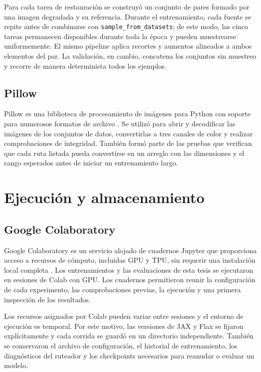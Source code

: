 \documentclass[
  11pt,
  oneside,
  english,
  spanish,
  singlespacing,
  headsepline
]{MastersDoctoralThesis}
\begin{document}
Para cada tarea de restauración se construyó un conjunto de pares formado por una imagen degradada y su referencia. Durante el entrenamiento, cada fuente se repite antes de combinarse con \texttt{sample\_from\_datasets}; de este modo, las cinco tareas permanecen disponibles durante toda la época y pueden muestrearse uniformemente. El mismo pipeline aplica recortes y aumentos alineados a ambos elementos del par. La validación, en cambio, concatena los conjuntos sin muestreo y recorre de manera determinista todos los ejemplos.

\subsection{Pillow}

Pillow es una biblioteca de procesamiento de imágenes para Python con soporte para numerosos formatos de archivo \citep{pillowDocs}. Se utilizó para abrir y decodificar las imágenes de los conjuntos de datos, convertirlas a tres canales de color y realizar comprobaciones de integridad. También formó parte de las pruebas que verifican que cada ruta listada pueda convertirse en un arreglo con las dimensiones y el rango esperados antes de iniciar un entrenamiento largo.

\section{Ejecución y almacenamiento}

\subsection{Google Colaboratory}

Google Colaboratory es un servicio alojado de cuadernos Jupyter que proporciona acceso a recursos de cómputo, incluidas GPU y TPU, sin requerir una instalación local completa \citep{googleColab}. Los entrenamientos y las evaluaciones de esta tesis se ejecutaron en sesiones de Colab con GPU. Los cuadernos permitieron reunir la configuración de cada experimento, las comprobaciones previas, la ejecución y una primera inspección de los resultados.

Los recursos asignados por Colab pueden variar entre sesiones y el entorno de ejecución es temporal. Por este motivo, las versiones de JAX y Flax se fijaron explícitamente y cada corrida se guardó en un directorio independiente. También se conservaron el archivo de configuración, el historial de entrenamiento, los diagnósticos del ruteador y los checkpoints necesarios para reanudar o evaluar un modelo.
\end{document}
